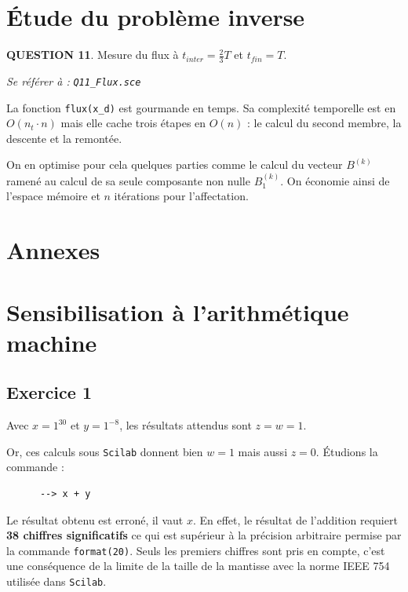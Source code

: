 \documentclass[a4paper,11pt]{article}
\newcommand{\quest}[1]{\small\textbf{#1}\normalsize}
\theoremstyle{nonumberplain}
\theoremstyle{nonumberplain}
\theoremstyle{nonumberplain}
\begin{document}
\medskip
\section{\'{E}tude du problème inverse}

    \quest{QUESTION 11}. Mesure du flux à $t_{inter} = \frac{2}{3} T$ et $t_{fin} = T$.
    \begin{ref_scilab}
        \emph{Se référer à :} \texttt{\emph{Q11\_Flux.sce}}
    \end{ref_scilab}

La fonction \texttt{flux(x\_d)} est gourmande en temps.
Sa complexité temporelle est en $O(n_t \cdot n)$ mais elle cache trois
étapes en $O(n)$ : le calcul du second membre, la descente et la remontée.

\medskip
On en optimise pour cela quelques parties comme le calcul du vecteur $B^{(k)}$ ramené
au calcul de sa seule composante non nulle $B_1^{(k)}$. On économie ainsi de l'espace mémoire
et $n$ itérations pour l'affectation.

\section*{Annexes}

\vspace{8cm}

\section{Sensibilisation à l'arithmétique machine}
\subsection*{Exercice 1}

    Avec $x = 1^{30}$ et $y = 1^{-8}$, les résultats attendus sont $z = w = 1$.

    Or, ces calculs sous \texttt{Scilab} donnent bien $w = 1$ mais aussi $z = 0$. \'{E}tudions la commande :
    \begin{verbatim}
      --> x + y
    \end{verbatim}
    Le résultat obtenu est erroné, il vaut $x$. En effet, le résultat de l'addition requiert \textbf{38 chiffres significatifs} ce qui est supérieur à la précision arbitraire permise par la commande \texttt{format(20)}.
    Seuls les premiers chiffres sont pris en compte, c'est une conséquence de la limite de la taille de la mantisse avec la norme IEEE 754 utilisée dans \texttt{Scilab}.
    \newline
\end{document}
